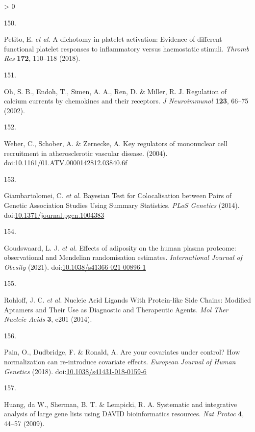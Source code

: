 \documentclass[11pt,twoside]{bristolthesis}
\newlength{\cslhangindent}
\newlength{\csllabelwidth}
\newenvironment{CSLReferences}[2] %
 {%
  \setlength{\parindent}{0pt}
  \ifodd #1 \everypar{\setlength{\hangindent}{\cslhangindent}}\ignorespaces\fi
  \ifnum #2 > 0
  \setlength{\parskip}{#2\baselineskip}
  \fi
 }%
 {}
\newcommand{\CSLLeftMargin}[1]{\parbox[t]{\csllabelwidth}{#1}}
\newcommand{\CSLRightInline}[1]{\parbox[t]{\linewidth - \csllabelwidth}{#1}\break}
\begin{document}
\begin{CSLReferences}{0}{0}
\leavevmode\hypertarget{ref-Petito2018}{}%
\CSLLeftMargin{150. }
\CSLRightInline{Petito, E. \emph{et al.} {A dichotomy in platelet activation: Evidence of different functional platelet responses to inflammatory versus haemostatic stimuli}. \emph{Thromb Res} \textbf{172}, 110--118 (2018).}

\leavevmode\hypertarget{ref-Oh2002}{}%
\CSLLeftMargin{151. }
\CSLRightInline{Oh, S. B., Endoh, T., Simen, A. A., Ren, D. \& Miller, R. J. {Regulation of calcium currents by chemokines and their receptors}. \emph{J Neuroimmunol} \textbf{123}, 66--75 (2002).}

\leavevmode\hypertarget{ref-Weber2004}{}%
\CSLLeftMargin{152. }
\CSLRightInline{Weber, C., Schober, A. \& Zernecke, A. {Key regulators of mononuclear cell recruitment in atherosclerotic vascular disease}. (2004). doi:\href{https://doi.org/10.1161/01.ATV.0000142812.03840.6f}{10.1161/01.ATV.0000142812.03840.6f}}

\leavevmode\hypertarget{ref-Giambartolomei2014}{}%
\CSLLeftMargin{153. }
\CSLRightInline{Giambartolomei, C. \emph{et al.} {Bayesian Test for Colocalisation between Pairs of Genetic Association Studies Using Summary Statistics}. \emph{PLoS Genetics} (2014). doi:\href{https://doi.org/10.1371/journal.pgen.1004383}{10.1371/journal.pgen.1004383}}

\leavevmode\hypertarget{ref-Goudswaard2021}{}%
\CSLLeftMargin{154. }
\CSLRightInline{Goudswaard, L. J. \emph{et al.} {Effects of adiposity on the human plasma proteome: observational and Mendelian randomisation estimates}. \emph{International Journal of Obesity} (2021). doi:\href{https://doi.org/10.1038/s41366-021-00896-1}{10.1038/s41366-021-00896-1}}

\leavevmode\hypertarget{ref-Rohloff2014}{}%
\CSLLeftMargin{155. }
\CSLRightInline{Rohloff, J. C. \emph{et al.} {Nucleic Acid Ligands With Protein-like Side Chains: Modified Aptamers and Their Use as Diagnostic and Therapeutic Agents}. \emph{Mol Ther Nucleic Acids} \textbf{3}, e201 (2014).}

\leavevmode\hypertarget{ref-Pain2018}{}%
\CSLLeftMargin{156. }
\CSLRightInline{Pain, O., Dudbridge, F. \& Ronald, A. {Are your covariates under control? How normalization can re-introduce covariate effects}. \emph{European Journal of Human Genetics} (2018). doi:\href{https://doi.org/10.1038/s41431-018-0159-6}{10.1038/s41431-018-0159-6}}

\leavevmode\hypertarget{ref-Huang2009}{}%
\CSLLeftMargin{157. }
\CSLRightInline{Huang, da W., Sherman, B. T. \& Lempicki, R. A. {Systematic and integrative analysis of large gene lists using DAVID bioinformatics resources}. \emph{Nat Protoc} \textbf{4}, 44--57 (2009).}


\end{CSLReferences}
\end{document}
